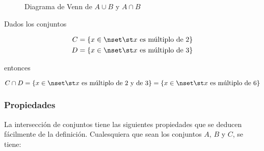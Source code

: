 \begin{figure}
  \centering
  \caption{Diagrama de Venn de $A \cup B$ y $A \cap B$}%
  \label{fig:venn-union-interseccion}
\end{figure}

\begin{example}
  Dados los conjuntos

  \begin{align*}
    C &= \{x \in \nset \st x \ \text{es múltiplo de} \ 2\} \\
    D &= \{x \in \nset \st x \ \text{es múltiplo de} \ 3\} \\
  \end{align*}

  \noindent entonces

  \[ C \cap D = \{x \in \nset \st x \ \text{es múltiplo de} \ 2 \ \text{y
  de} \ 3\} = \{x \in \nset \st x \ \text{es múltiplo de} \ 6\} \]
\end{example}





\subsubsection{Propiedades}

La intersección de conjuntos tiene las siguientes propiedades que se deducen
fácilmente de la definición. Cualesquiera que sean los conjuntos $A$, $B$ y
$C$, se tiene:

